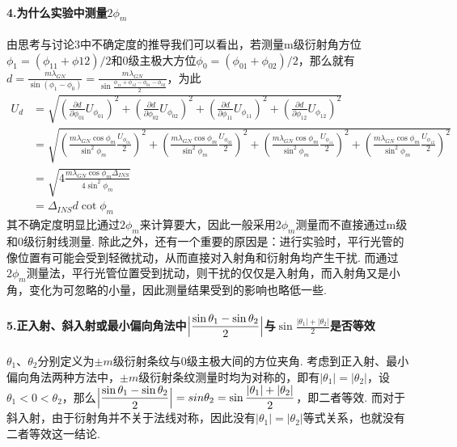 \documentclass[UTF8]{ctexart}
\begin{document}
\paragraph{4.\quad 为什么实验中测量$2\phi_m$}\quad\par
由思考与讨论3中不确定度的推导我们可以看出，若测量m级衍射角方位$\phi_1=(\phi_{11}+\phi{12})/2$和0级主极大方位$\phi_0=(\phi_{01}+\phi_{02})/2$，那么就有$\displaystyle{d=\frac{m\lambda_{GN}}{\sin(\phi_1-\phi_0)}=\frac{m\lambda_{GN}}{\sin\frac{\phi_{11}+\phi_{12}-\phi_{01}-\phi_{02}}{2}}}$，为此
\begin{equation}\nonumber\begin{split}
    U_d&=
    \sqrt{(\frac{\partial d}{\partial \phi_{01}}U_{\phi_{01}})^2+(\frac{\partial d}{\partial \phi_{02}}U_{\phi_{02}})^2+(\frac{\partial d}{\partial \phi_{11}}U_{\phi_{11}})^2+(\frac{\partial d}{\partial \phi_{12}}U_{\phi_{12}})^2}\\
    &=\sqrt{
        (\frac{m\lambda_{GN}\cos\phi_m}
        {\sin^2\phi_m}\frac{U_{\phi_{01}}}{2})^2+
        (\frac{m\lambda_{GN}\cos\phi_m}
        {\sin^2\phi_m}\frac{U_{\phi_{02}}}{2})^2+
        (\frac{m\lambda_{GN}\cos\phi_m}
        {\sin^2\phi_m}\frac{U_{\phi_{11}}}{2})^2+
        (\frac{m\lambda_{GN}\cos\phi_m}
        {\sin^2\phi_m}\frac{U_{\phi_{12}}}{2})^2
    }\\
    &=\sqrt{4\frac{m\lambda_{GN}\cos\phi_m\Delta_{INS}}{4\sin^2\phi_m}}\\
    &=\Delta_{INS}d \cot\phi_m
\end{split}\end{equation}
其不确定度明显比通过$2\phi_m$来计算要大，因此一般采用$2\phi_m$测量而不直接通过m级和0级衍射线测量. 除此之外，还有一个重要的原因是：进行实验时，平行光管的像位置有可能会受到轻微扰动，从而直接对入射角和衍射角均产生干扰. 而通过$2\phi_m$测量法，平行光管位置受到扰动，则干扰的仅仅是入射角，而入射角又是小角，变化为可忽略的小量，因此测量结果受到的影响也略低一些.

\paragraph{5.\quad 正入射、斜入射或最小偏向角法中$\displaystyle{\Big{|}\frac{\sin\theta_1-\sin\theta_2}{2}\Big{|}}$与$\displaystyle{\sin\frac{|\theta_1|+|\theta_2|}{2}}$是否等效}\quad\par
$\theta_1$、$\theta_2$分别定义为$\pm m$级衍射条纹与0级主极大间的方位夹角. 考虑到正入射、最小偏向角法两种方法中，$\pm m$级衍射条纹测量时均为对称的，即有$|\theta_1|=|\theta_2|$，设$\theta_1<0<\theta_2$，那么$\displaystyle{\Big{|}\frac{\sin\theta_1-\sin\theta_2}{2}\Big{|}=sin\theta_2=\sin\frac{|\theta_1|+|\theta_2|}{2}}$，即二者等效. 而对于斜入射，由于衍射角并不关于法线对称，因此没有$|\theta_1|=|\theta_2|$等式关系，也就没有二者等效这一结论.
\end{document}
